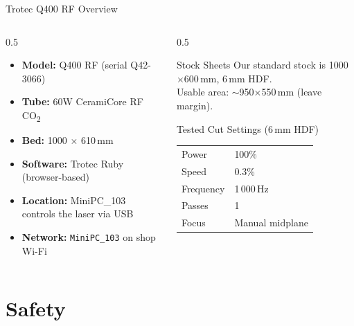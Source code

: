 \documentclass[aspectratio=169]{beamer}
\begin{document}
\begin{frame}{Trotec Q400 RF Overview}
\begin{columns}
\begin{column}{0.5\textwidth}
\begin{itemize}
    \item \textbf{Model:} Q400 RF (serial Q42-3066)
    \item \textbf{Tube:} 60W CeramiCore RF CO\textsubscript{2}
    \item \textbf{Bed:} 1000 $\times$ 610\,mm
    \item \textbf{Software:} Trotec Ruby (browser-based)
    \item \textbf{Location:} MiniPC\_103 controls the laser via USB
    \item \textbf{Network:} \texttt{MiniPC\_103} on shop Wi-Fi
\end{itemize}
\end{column}
\begin{column}{0.5\textwidth}
\begin{block}{Stock Sheets}
Our standard stock is 1000$\times$600\,mm, 6\,mm HDF.\\
Usable area: $\sim$950$\times$550\,mm (leave margin).
\end{block}
\vspace{0.5em}
\begin{block}{Tested Cut Settings (6\,mm HDF)}
\begin{tabular}{ll}
Power & 100\% \\
Speed & 0.3\% \\
Frequency & 1\,000\,Hz \\
Passes & 1 \\
Focus & Manual midplane \\
\end{tabular}
\end{block}
\end{column}
\end{columns}
\end{frame}

\section{Safety}
\end{document}
